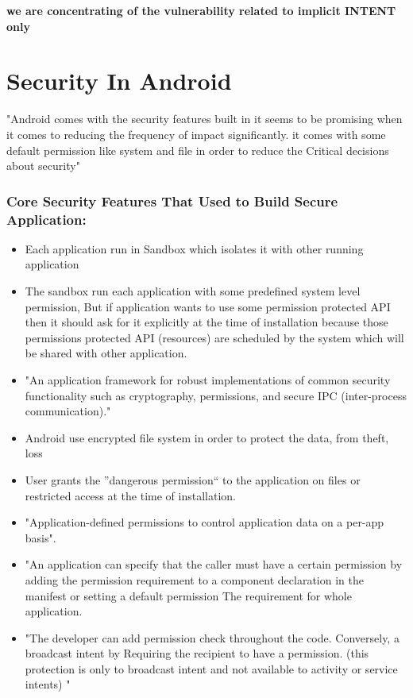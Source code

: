 \documentclass[11pt]{report}
\begin{document}
\par 
\textbf{we are concentrating of the vulnerability related to implicit INTENT only}  

\chapter{Security In Android}

"Android comes with the security features built in it seems to be promising when it comes to reducing the frequency of impact significantly.
it comes with some default permission like system and file in order to reduce the Critical decisions about security"\cite{st}

\subsection{Core Security Features That Used to Build Secure Application:}
\begin{itemize}
  \item Each application run in Sandbox which isolates it with other running application
  
  \item The sandbox run each application with some predefined system level permission, But if application wants to use some permission protected API then it should ask for it explicitly at the time of 
  installation because those permissions protected API (resources) are scheduled by the system which will be shared with other application.
  
  \item "An application framework for robust implementations of common security functionality such as cryptography, permissions, and secure IPC (inter-process communication).\cite{st}"
  \item Android use encrypted file system in order  to protect the data, from theft, loss 
  
  \item User grants the ''dangerous permission``  to the application on files or restricted access at the time of installation.
  
  \item "Application-defined permissions to control application data on a per-app basis".\cite{st}
  
  \item "An application can specify that the caller must have  a certain permission by adding the permission requirement to a component declaration in the manifest or setting a default permission 
   The requirement for whole application.\cite{analyZING}
  
  \item "The developer can add permission check throughout the code. Conversely, a broadcast intent by Requiring the recipient to have  a permission.
  (this protection is only to broadcast intent and not available to activity or service intents) "\cite{analyZING}

\end{itemize}
 
\end{document}
